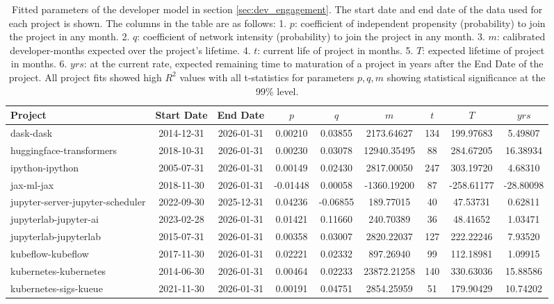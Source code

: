 \documentclass[conference]{IEEEtran}
\begin{document}
\begin{table}
\centering
\caption{\label{os_developer_model_stats} \small Fitted parameters of the developer model in section \ref{sec:dev_engagement}. The start date and end date of the data used for each project is shown. The columns in the table are as follows: 1. $p$: coefficient of independent propensity (probability) to join the project in any month.
2. $q$: coefficient of network intensity (probability) to join the project in any month.
3. $m$: calibrated developer-months expected over the project's lifetime.
4. $t$: current life of project in months.
5. $T$: expected lifetime of project in months.
6. $yrs$: at the current rate, expected remaining time to maturation of a project in years after the End Date of the project.
All project fits showed high $R^2$ values with all t-statistics for parameters $p, q, m$ showing statistical significance at the 99\% level. 
}
\begin{tabular}{lcccccccc}
\toprule
Project & Start Date & End Date & $p$ & $q$ & $m$ & $t$ & $T$ & $yrs$ \\
\midrule
dask-dask & 2014-12-31 & 2026-01-31 & 0.00210 & 0.03855 & 2173.64627 & 134 & 199.97683 & 5.49807 \\
huggingface-transformers & 2018-10-31 & 2026-01-31 & 0.00230 & 0.03078 & 12940.35495 & 88 & 284.67205 & 16.38934 \\
ipython-ipython & 2005-07-31 & 2026-01-31 & 0.00149 & 0.02430 & 2817.00050 & 247 & 303.19720 & 4.68310 \\
jax-ml-jax & 2018-11-30 & 2026-01-31 & -0.01448 & 0.00058 & -1360.19200 & 87 & -258.61177 & -28.80098 \\
jupyter-server-jupyter-scheduler & 2022-09-30 & 2025-12-31 & 0.04236 & -0.06855 & 189.77015 & 40 & 47.53731 & 0.62811 \\
jupyterlab-jupyter-ai & 2023-02-28 & 2026-01-31 & 0.01421 & 0.11660 & 240.70389 & 36 & 48.41652 & 1.03471 \\
jupyterlab-jupyterlab & 2015-07-31 & 2026-01-31 & 0.00358 & 0.03007 & 2820.22037 & 127 & 222.22246 & 7.93520 \\
kubeflow-kubeflow & 2017-11-30 & 2026-01-31 & 0.02221 & 0.02332 & 897.26940 & 99 & 112.18981 & 1.09915 \\
kubernetes-kubernetes & 2014-06-30 & 2026-01-31 & 0.00464 & 0.02233 & 23872.21258 & 140 & 330.63036 & 15.88586 \\
kubernetes-sigs-kueue & 2021-11-30 & 2026-01-31 & 0.00191 & 0.04751 & 2854.25959 & 51 & 179.90429 & 10.74202 \\

\end{tabular}
\end{table}
\end{document}
